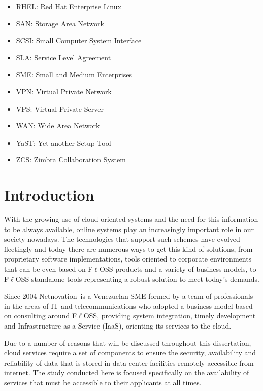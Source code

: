 \documentclass[a4paper, 12pt]{book}
\begin{document}
\begin{itemize}[label={}]
	\item RHEL: Red Hat Enterprise Linux
	\item SAN: Storage Area Network
	\item SCSI: Small Computer System Interface
	\item SLA: Service Level Agreement
	\item SME: Small and Medium Enterprises
	\item VPN: Virtual Private Network
	\item VPS: Virtual Private Server
	\item WAN: Wide Area Network
	\item YaST: Yet another Setup Tool
	\item ZCS: Zimbra Collaboration System
\end{itemize}


%
\tableofcontents  	%
\listoffigures  	%
\listoftables 		%

%
\chapter{Introduction}
\label{chap:introduction}

\noindent With the growing use of cloud-oriented systems and the need for this information to be always available, online systems play an increasingly important role in our society nowadays. The technologies that support such schemes have evolved fleetingly and today there are numerous ways to get this kind of solutions, from proprietary software implementations, tools oriented to corporate environments that can be even based on F$\ell$OSS products and a variety of business models, to F$\ell$OSS standalone tools representing a robust solution to meet today's demands.\bigskip

\noindent Since 2004 Netnovation\texttrademark \ is a Venezuelan SME formed by a team of professionals in the areas of IT and telecommunications who adopted a business model based on consulting around F$\ell$OSS, providing system integration, timely development and Infrastructure as a Service (IaaS), orienting its services to the cloud.\bigskip

\noindent Due to a number of reasons that will be discussed throughout this dissertation, cloud services require a set of components to ensure the security, availability and reliability of data that is stored in data center facilities remotely accessible from internet. The study conducted here is focused specifically on the availability of services that must be accessible to their applicants at all times.\bigskip
\end{document}

